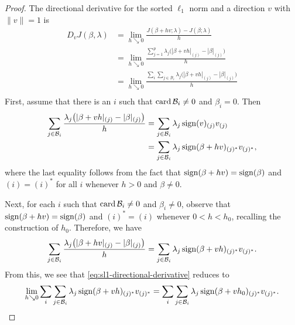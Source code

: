 \begin{proof}
  The directional derivative for the sorted \(\ell_1\) norm and a direction
  \(v\) with \(\lVert v \rVert = 1\) is
  \begin{equation}
    \label{eq:sl1-directional-derivative}
    \begin{aligned}
      D_v J(\beta, \lambda) & = \lim_{h \searrow 0} \frac{J(\beta + h v; \lambda) - J(\beta; \lambda)}{h}                                            \\
                            & = \lim_{h \searrow 0} \frac{\sum_{j=1}^p\lambda_j\big(|\beta + vh|_{(j)} - |\beta|_{(j)}\big)}{h}                      \\
                            & = \lim_{h \searrow 0}\frac{\sum_i \sum_{j \in \mathcal{B}_i} \lambda_j\big(|\beta + vh|_{(j)} - |\beta|_{(j)}\big)}{h} \\
    \end{aligned}
  \end{equation}
  First, assume that there is an \(i\) such that \(\operatorname{card} \mathcal{B}_i \neq 0\)
  and \(\beta_i = 0\).
  Then
  \[
    \begin{aligned}
      \sum_{j \in \mathcal{B}_i}\frac{\lambda_j \big( |\beta + vh|_{(j)} - |\beta|_{(j)}\big)}{h}
       & = \sum_{j \in \mathcal{B}_i} \lambda_j \operatorname{sign}(v)_{(j)}v_{(j)}               \\
       & = \sum_{j \in \mathcal{B}_i} \lambda_j \operatorname{sign}(\beta + hv)_{(j)^*}v_{(j)^*},
    \end{aligned}
  \]
  where the last equality follows from the fact that \(\operatorname{sign}(\beta + hv) =
  \operatorname{sign}(\beta)\) and \((i) = (i)^*\) for all \(i\) whenever \(h > 0\) and
  \(\beta \neq 0\).

  Next, for each \(i\) such that \(\operatorname{card} \mathcal{B}_i \neq 0\) and
  \(\beta_i \neq 0\), observe that \(\operatorname{sign}(\beta + hv) = \operatorname{sign}(\beta)\) and
  \((i)^* = (i)\) whenever \(0 < h < h_0\), recalling the construction
  of \(h_0\).
  Therefore, we have
  \[
    \sum_{j \in \mathcal{B}_i} \frac{\lambda_j\big(|\beta + hv|_{(j)} - |\beta|_{(j)}\big)}{h}
    = \sum_{j \in \mathcal{B}_i} \lambda_j\operatorname{sign}(\beta + vh)_{(j)^*}v_{(j)^*}.
  \]
  From this, we see that \eqref{eq:sl1-directional-derivative} reduces to
  \[
    \lim_{h \searrow 0} \sum_i \sum_{j \in \mathcal{B}_i} \lambda_j\operatorname{sign}(\beta + vh)_{(j)^*}v_{(j)^*}
    = \sum_i \sum_{j \in \mathcal{B}_i} \lambda_j\operatorname{sign}(\beta + vh_0)_{(j)^*}v_{(j)^*}.
  \]

\end{proof}
